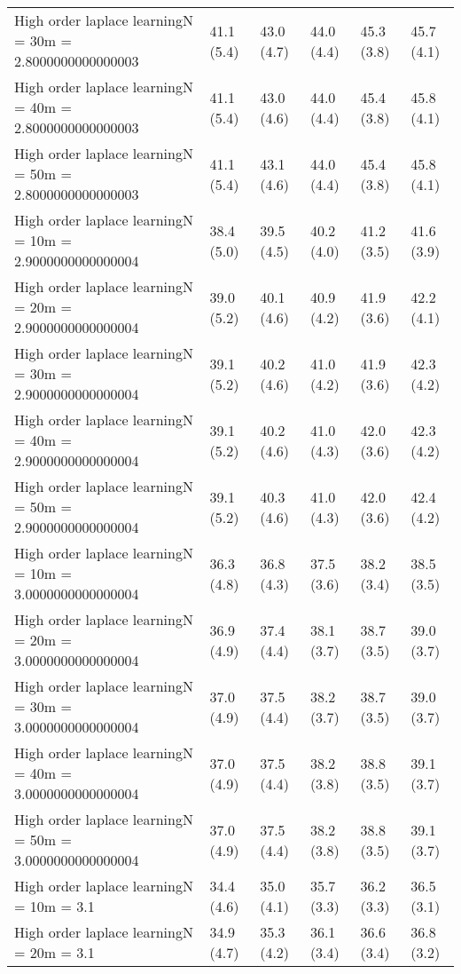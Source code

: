\documentclass{article}
\begin{document}
\begin{table*}[t!]
\begin{center}
\begin{small}
\begin{sc}
\begin{tabular}{llllll}
High order laplace learningN = 30m = 2.8000000000000003&41.1 (5.4)      &43.0 (4.7)      &44.0 (4.4)      &45.3 (3.8)      &45.7 (4.1)      \\
High order laplace learningN = 40m = 2.8000000000000003&41.1 (5.4)      &43.0 (4.6)      &44.0 (4.4)      &45.4 (3.8)      &45.8 (4.1)      \\
High order laplace learningN = 50m = 2.8000000000000003&41.1 (5.4)      &43.1 (4.6)      &44.0 (4.4)      &45.4 (3.8)      &45.8 (4.1)      \\
High order laplace learningN = 10m = 2.9000000000000004&38.4 (5.0)      &39.5 (4.5)      &40.2 (4.0)      &41.2 (3.5)      &41.6 (3.9)      \\
High order laplace learningN = 20m = 2.9000000000000004&39.0 (5.2)      &40.1 (4.6)      &40.9 (4.2)      &41.9 (3.6)      &42.2 (4.1)      \\
High order laplace learningN = 30m = 2.9000000000000004&39.1 (5.2)      &40.2 (4.6)      &41.0 (4.2)      &41.9 (3.6)      &42.3 (4.2)      \\
High order laplace learningN = 40m = 2.9000000000000004&39.1 (5.2)      &40.2 (4.6)      &41.0 (4.3)      &42.0 (3.6)      &42.3 (4.2)      \\
High order laplace learningN = 50m = 2.9000000000000004&39.1 (5.2)      &40.3 (4.6)      &41.0 (4.3)      &42.0 (3.6)      &42.4 (4.2)      \\
High order laplace learningN = 10m = 3.0000000000000004&36.3 (4.8)      &36.8 (4.3)      &37.5 (3.6)      &38.2 (3.4)      &38.5 (3.5)      \\
High order laplace learningN = 20m = 3.0000000000000004&36.9 (4.9)      &37.4 (4.4)      &38.1 (3.7)      &38.7 (3.5)      &39.0 (3.7)      \\
High order laplace learningN = 30m = 3.0000000000000004&37.0 (4.9)      &37.5 (4.4)      &38.2 (3.7)      &38.7 (3.5)      &39.0 (3.7)      \\
High order laplace learningN = 40m = 3.0000000000000004&37.0 (4.9)      &37.5 (4.4)      &38.2 (3.8)      &38.8 (3.5)      &39.1 (3.7)      \\
High order laplace learningN = 50m = 3.0000000000000004&37.0 (4.9)      &37.5 (4.4)      &38.2 (3.8)      &38.8 (3.5)      &39.1 (3.7)      \\
High order laplace learningN = 10m = 3.1&34.4 (4.6)      &35.0 (4.1)      &35.7 (3.3)      &36.2 (3.3)      &36.5 (3.1)      \\
High order laplace learningN = 20m = 3.1&34.9 (4.7)      &35.3 (4.2)      &36.1 (3.4)      &36.6 (3.4)      &36.8 (3.2)      \\

\end{tabular}
\end{sc}
\end{small}
\end{center}
\end{table*}
\end{document}

